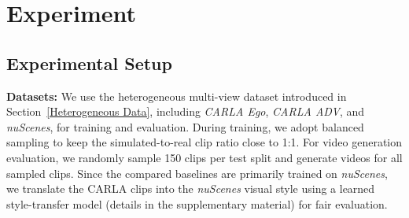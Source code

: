 \documentclass[runningheads]{llncs}
\begin{document}







\section{Experiment}
\subsection{Experimental Setup}
\textbf{Datasets:} We use the heterogeneous multi-view dataset introduced in Section~\ref{Heterogeneous Data}, including \textit{CARLA Ego}, \textit{CARLA ADV}, and \textit{nuScenes}, for training and evaluation. During training, we adopt balanced sampling to keep the simulated-to-real clip ratio close to 1:1. For video generation evaluation, we randomly sample 150 clips per test split and generate videos for all sampled clips. Since the compared baselines are primarily trained on \textit{nuScenes}, we translate the CARLA clips into the \textit{nuScenes} visual style using a learned style-transfer model (details in the supplementary material) for fair evaluation.
\end{document}
